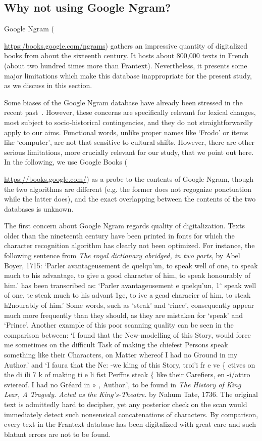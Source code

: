 \documentclass[12pt,twocolumn,amsmath,amssymb,aps,longbibliography]{revtex4-1}  %
\newcommand{\tit}{\textit}
\begin{document}
\subsection{Why not using Google Ngram? \label{A6}}
Google Ngram ({\url{https:/books.google.com/ngrams}) gathers an impressive quantity of digitalized books from about the sixteenth century. It hosts about 800,000 texts in French (about two hundred times more than Frantext). Nevertheless, it presents some major limitations which make this database inappropriate for the present study, as we discuss in this section.

Some biases of the Google Ngram database have already been stressed in the recent past~\cite{pechenick2015characterizing}. However, these concerns are specifically relevant for lexical changes, most subject to socio-historical contingencies, and they do not straightforwardly apply to our aims. Functional words, unlike proper names like `Frodo' or items like `computer', are not that sensitive to cultural shifts. However, there are other serious limitations, more crucially relevant for our study, that we point out here. 
In the following, we use Google Books ({\url{https://books.google.com/}) as a probe to the contents of Google Ngram, though the two algorithms are different (e.g. the former does not regognize ponctuation while the latter does), and the exact overlapping between the contents of the two databases is unknown. 

The first concern about Google Ngram regards quality of digitalization. Texts older than the nineteenth century have been printed in fonts for which the character recognition algorithm has clearly not been optimized. For instance, the following sentence from \tit{The royal dictionary abridged, in two parts}, by Abel Boyer, 1715: `Parler avantageusement de quelqu'un, to speak well of one, to speak much to his advantage, to give a good character of him, to speak honourably of him.' has been transcribed as: `Parler avantageusement e quelqu'un, 1$^{\circ}$ speak well of one, te steak much to his advant 1ge, to ive a gead characier of him, to steak h2nourably of him.'  Some words, such as `steak' and `rince', consequently appear much more frequently than they should, as they are mistaken for `speak' and `Prince'. Another example of this poor scanning quality can be seen in the comparison between: `I found that the New-modelling of this Story, would force me sometimes on the difficult Task of making the chiefest Persons speak something like their Characters, on Matter whereof I had no Ground in my Author.' and `I faura that the Ne: -we kling of this Story, troi'i fr e ve \{ ctives on the di ili 7 k of making ti e li fist Perffns steak \{ like their Carefiers, en -i/attro sviereof. I had no Gr\'eard in » , Author.', to be found in \tit{The History of King Lear, A Tragedy. Acted as the King's-Theatre.} by Nahum Tate, 1736. The original text is admittedly hard to decipher, yet any posterior check on the scan would immediately detect such nonsensical concatenations of characters. By comparison, every text in the Frantext database has been digitalized with great care and such blatant errors are not to be found. 

}}
\end{document}
